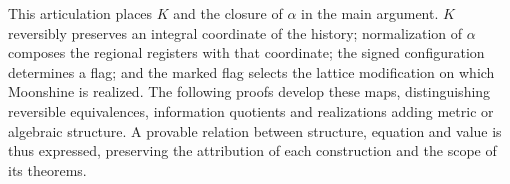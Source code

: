 This articulation places $K$ and the closure of $\alpha$ in the main
argument. $K$ reversibly preserves an integral coordinate of the
history; normalization of $\alpha$ composes the regional registers
with that coordinate; the signed configuration determines a flag; and
the marked flag selects the lattice modification on which
Moonshine is realized. The following proofs develop these
maps, distinguishing reversible equivalences, information
quotients and realizations adding metric or algebraic
structure. A provable relation between structure,
equation and value is thus expressed, preserving the attribution of each construction and the
scope of its theorems.




